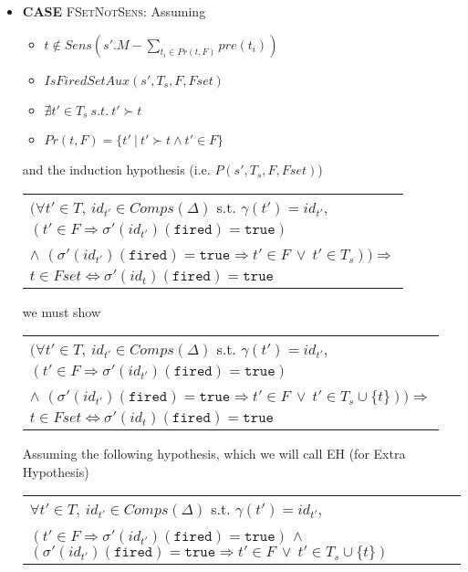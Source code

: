 \documentclass[dvipsnames,12pt]{article}
\begin{document}
\begin{niproof}
\begin{itemize}
  \item \textbf{CASE} \textsc{FSetNotSens}:
    Assuming
    \begin{itemize}
    \item $t\notin{}Sens(s'.M-\sum\limits_{t_i\in{}Pr(t,F)}pre(t_i))$
    \item $IsFiredSetAux(s',T_s,F,Fset)$
    \item $\nexists{}t'\in{}T_s~s.t.~t'\succ{}t$
    \item $Pr(t,F)=\{t'~\vert~t'\succ{}t\land{}t'\in{}F\}$
    \end{itemize}
    and the induction hypothesis (i.e. $P(s',T_s,F,Fset)$)
    \begin{ih}
      \begin{tabular}{l}
        $\big(\forall{}t'\in{}T,~id_{t'}\in{}Comps(\Delta)$
        s.t. $\gamma(t')=id_{t'}$,\\
        $(t'\in{}F\Rightarrow\sigma'(id_{t'})(\texttt{fired})=\mathtt{true})$\\
        $\land$
        $(\sigma'(id_{t'})(\texttt{fired})=\mathtt{true}\Rightarrow{}t'\in{}F~\lor~{}t'\in{}T_s)\big)\Rightarrow$ \\
        $t\in{}Fset\Leftrightarrow\sigma'(id_t)(\texttt{fired})=\mathtt{true}$
      \end{tabular}
    \end{ih}

    we must show

    \begin{frameb}
      \begin{tabular}{l}
        $\big(\forall{}t'\in{}T,~id_{t'}\in{}Comps(\Delta)$
        s.t. $\gamma(t')=id_{t'}$,\\
        $(t'\in{}F\Rightarrow\sigma'(id_{t'})(\texttt{fired})=\mathtt{true})$\\
        $\land$
        $(\sigma'(id_{t'})(\texttt{fired})=\mathtt{true}\Rightarrow{}t'\in{}F~\lor~{}t'\in{}T_s\cup\{t\})\big)\Rightarrow$ \\
        $t\in{}Fset\Leftrightarrow\sigma'(id_t)(\texttt{fired})=\mathtt{true}$
      \end{tabular}
    \end{frameb}

    Assuming the following hypothesis, which we will call EH (for
    Extra Hypothesis)

    \begin{center}
      \begin{tabular}{l}
        $\forall{}t'\in{}T,~id_{t'}\in{}Comps(\Delta)$
        s.t. $\gamma(t')=id_{t'}$,\\
        $(t'\in{}F\Rightarrow\sigma'(id_{t'})(\texttt{fired})=\mathtt{true})$
        $\land$
        $(\sigma'(id_{t'})(\texttt{fired})=\mathtt{true}\Rightarrow{}t'\in{}F~\lor~{}t'\in{}T_s\cup\{t\})$ \\
      \end{tabular}
    \end{center}


\end{itemize}
\end{niproof}
\end{document}
